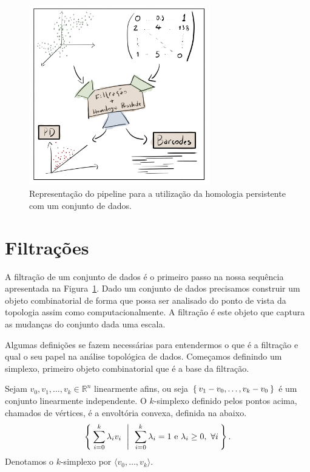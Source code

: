 \begin{figure}[!htpb]
  \centering
  \includegraphics[width=0.7\textwidth]{images/pipeline_hp.png}
  \caption{Representação do pipeline para a utilização da homologia persistente
          com um conjunto de dados.}
  \label{fig:pipeline_hp}
  \fautor
\end{figure}


\section{Filtrações}
A filtração de um conjunto de dados é o primeiro passo na nossa sequência apresentada
na Figura~\ref{fig:pipeline_hp}.
Dado um conjunto de dados precisamos construir um objeto combinatorial de forma
que possa ser analisado do ponto de vista da topologia assim como computacionalmente.
A filtração é este objeto que captura as mudanças do conjunto dada uma escala.

Algumas definições se fazem necessárias para entendermos o que é a filtração
e qual o seu papel na análise topológica de dados. Começamos definindo um simplexo,
primeiro objeto combinatorial que é a base da filtração.

\begin{defi}
  Sejam $v_0, v_1, \dots, v_k \in \mathbb{R}^n$ linearmente afins, ou seja $\Set{v_1 - v_0, \dots, v_k - v_0}$
  é um conjunto linearmente independente. O $k$-simplexo definido pelos pontos acima,
  chamados de vértices, é a envoltória convexa, definida na abaixo.
  \begin{equation}
    \label{eq:envconv}
    \Set{\sum_{i=0}^k \lambda_i v_i \ | \ \sum_{i=0}^k \lambda_i = 1 \text{ e }
          \lambda_i \ge 0, \ \forall i}.
  \end{equation}
  Denotamos o $k$-simplexo por $\langle v_0, \dots, v_k \rangle$.
\end{defi}


